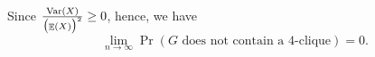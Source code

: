 \documentclass{homework}
\begin{document}
\begin{solution}
  Since $\frac{\mathop{\mathrm{Var}}\displaylimits(X)}{{\bigl(\mathop{\mathbb{E}}\displaylimits(X)\bigr)}^{2}} \ge 0$, hence, we have
  \begin{equation*}
    \lim_{n \to \infty} \Pr(G \text{ does not contain a $4$-clique}) = 0.
  \end{equation*}

\end{solution}
\end{document}
